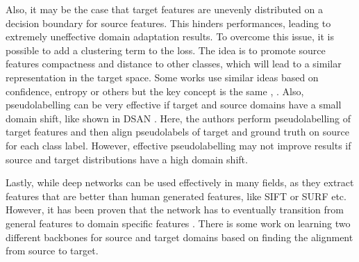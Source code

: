 Also, it may be the case that target features are unevenly distributed on a decision boundary for source features. This  hinders performances, leading to extremely uneffective domain adaptation results. To overcome this issue, it is possible to add a clustering term to the loss. The idea is to promote source features compactness and distance to other classes, which will lead to a similar representation in the target space. Some works use similar ideas based on confidence, entropy or others but the key concept is the same \cite[Kang et al.]{CAN}, \cite[Chen et al]{joint}.
Also, pseudolabelling can be very effective if target and source domains have a small domain shift, like shown in DSAN \cite[Zhu et al.]{Zhu_2021}. Here, the authors perform pseudolabelling of target features and then align pseudolabels of target and ground truth on source for each class label. However, effective pseudolabelling may not improve results if source and target distributions have a high domain shift.


Lastly, while deep networks can be used effectively in many fields, as they extract features that are better than human generated features, like SIFT \cite[Lowe et al.]{sift} or SURF \cite[Bay et al.]{surf} etc. However, it has been proven that the network has to eventually transition from general features to domain specific features \cite[Long et al.]{mkmmd}. There is some work on learning two different backbones for source and target domains \cite[Rozantsev et al.]{residual} based on finding the alignment from source to target.